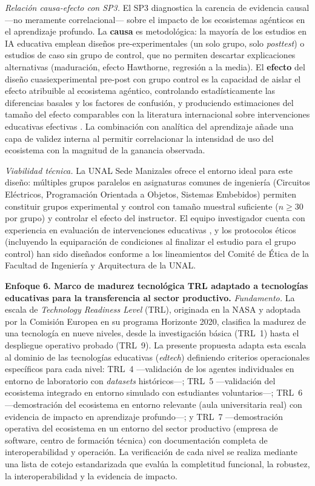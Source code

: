 \emph{Relación causa-efecto con SP3.}
El SP3 diagnostica la carencia de evidencia causal —no meramente correlacional— sobre
el impacto de los ecosistemas agénticos en el aprendizaje profundo. La \textbf{causa}
es metodológica: la mayoría de los estudios en IA educativa emplean diseños
pre-experimentales (un solo grupo, solo \emph{posttest}) o estudios de caso sin grupo
de control, que no permiten descartar explicaciones alternativas (maduración, efecto
Hawthorne, regresión a la media). El \textbf{efecto} del diseño cuasiexperimental
pre-post con grupo control es la capacidad de aislar el efecto atribuible al
ecosistema agéntico, controlando estadísticamente las diferencias basales y los
factores de confusión, y produciendo estimaciones del tamaño del efecto comparables
con la literatura internacional sobre intervenciones educativas efectivas
\cite{freeman2014active}. La combinación con analítica del aprendizaje añade una capa
de validez interna al permitir correlacionar la intensidad de uso del ecosistema con
la magnitud de la ganancia observada.

\emph{Viabilidad técnica.}
La UNAL Sede Manizales ofrece el entorno ideal para este diseño: múltiples grupos
paralelos en asignaturas comunes de ingeniería (Circuitos Eléctricos, Programación
Orientada a Objetos, Sistemas Embebidos) permiten constituir grupos experimental y
control con tamaño muestral suficiente ($n \geq 30$ por grupo) y controlar el efecto
del instructor. El equipo investigador cuenta con experiencia en evaluación de
intervenciones educativas \cite{escamilla2022artificial}, y los protocolos éticos
(incluyendo la equiparación de condiciones al finalizar el estudio para el grupo
control) han sido diseñados conforme a los lineamientos del Comité de Ética de la
Facultad de Ingeniería y Arquitectura de la UNAL.

\medskip

\noindent\textbf{Enfoque 6. Marco de madurez tecnológica TRL adaptado a tecnologías
educativas para la transferencia al sector productivo.}
\emph{Fundamento.}
La escala de \emph{Technology Readiness Level} (TRL), originada en la NASA y
adoptada por la Comisión Europea en su programa Horizonte 2020, clasifica la madurez
de una tecnología en nueve niveles, desde la investigación básica (TRL~1) hasta el
despliegue operativo probado (TRL~9). La presente propuesta adapta esta escala al
dominio de las tecnologías educativas (\emph{edtech}) definiendo criterios
operacionales específicos para cada nivel: TRL~4 —validación de los agentes
individuales en entorno de laboratorio con \emph{datasets} históricos—; TRL~5
—validación del ecosistema integrado en entorno simulado con estudiantes voluntarios—;
TRL~6 —demostración del ecosistema en entorno relevante (aula universitaria real) con
evidencia de impacto en aprendizaje profundo—; y TRL~7 —demostración operativa del
ecosistema en un entorno del sector productivo (empresa de software, centro de
formación técnica) con documentación completa de interoperabilidad y operación. La
verificación de cada nivel se realiza mediante una lista de cotejo estandarizada que
evalúa la completitud funcional, la robustez, la interoperabilidad y la evidencia de
impacto.


